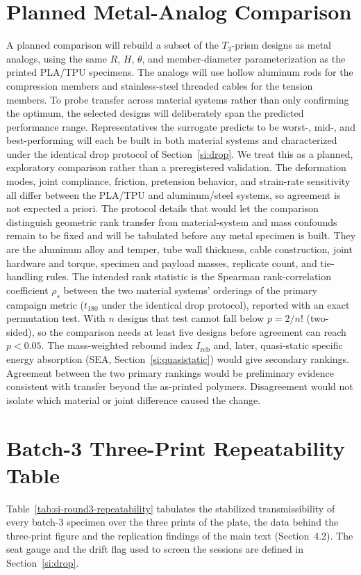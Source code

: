 \documentclass[11pt]{article}
\begin{document}
\section{Planned Metal-Analog Comparison}
\label{si:metal-validation}
A planned comparison will rebuild a subset of the $T_3$-prism
designs as metal analogs, using the same $R$, $H$, $\theta$, and
member-diameter parameterization as the printed PLA/TPU specimens. The
analogs will use hollow aluminum rods for the compression members and
stainless-steel threaded cables for the tension members. To probe transfer
across material systems rather than only confirming the optimum, the
selected designs will deliberately span the predicted performance range.
Representatives the surrogate predicts to be worst-, mid-, and
best-performing will each be built in both material systems and
characterized under the identical drop protocol of
Section~\ref{si:drop}. We treat this as a planned, exploratory comparison
rather than a preregistered validation. The deformation modes, joint
compliance, friction, pretension behavior, and strain-rate sensitivity all
differ between the PLA/TPU and aluminum/steel systems, so agreement is not
expected a priori. The protocol details that would let the comparison
distinguish geometric rank transfer from material-system and mass confounds
remain to be fixed and will be tabulated before any metal specimen is built.
They are the aluminum alloy and temper, tube wall thickness, cable
construction, joint hardware and torque, specimen and payload masses,
replicate count, and tie-handling rules. The intended rank statistic is the
Spearman rank-correlation coefficient $\rho_s$ between the two material
systems' orderings of the primary campaign metric ($t_{180}$ under the
identical drop protocol), reported with an exact permutation test. With $n$ designs that test cannot fall below $p = 2/n!$ (two-sided), so the comparison needs at least five designs before agreement can reach $p < 0.05$.
The mass-weighted rebound index $I_{\mathrm{reb}}$ and, later, quasi-static specific
energy absorption (SEA, Section~\ref{si:quasistatic}) would give secondary
rankings. Agreement between the
two primary rankings would be preliminary evidence consistent with transfer
beyond the as-printed polymers. Disagreement would not isolate which
material or joint difference caused the change.


\section{Batch-3 Three-Print Repeatability Table}
\label{si:threeprint}
Table~\ref{tab:si-round3-repeatability} tabulates the stabilized
transmissibility of every batch-3 specimen over the three prints of the plate,
the data behind the three-print figure and the replication findings of the
main text (Section~4.2). The seat gauge and the drift flag used to screen the
sessions are defined in Section~\ref{si:drop}.
\end{document}
